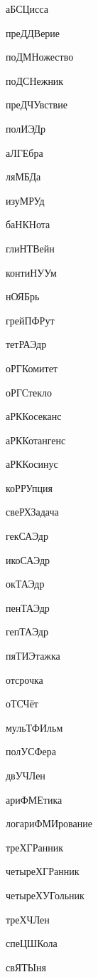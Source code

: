 \begin{multicols}{2}

аБСЦисса

преДДВерие

поДМНожество

поДСНежник

преДЧУвствие

полИЭДр

аЛГЕбра

ляМБДа

изуМРУд

баНКНота

глиНТВейн

контиНУУм

нОЯБрь

грейПФРут

тетРАЭдр

оРГКомитет

оРГСтекло

аРККосеканс

аРККотангенс

аРККосинус

коРРУпция

свеРХЗадача

гекСАЭдр

икоСАЭдр

окТАЭдр

пенТАЭдр

гепТАЭдр

пяТИЭтажка

отсрочка

оТСЧёт

мульТФИльм

полУСФера

двУЧЛен

ариФМЕтика

логариФМИрование

треХГРанник

четыреХГРанник

четыреХУГольник

треХЧЛен

спеЦШКола

свЯТЫня
\end{multicols}

